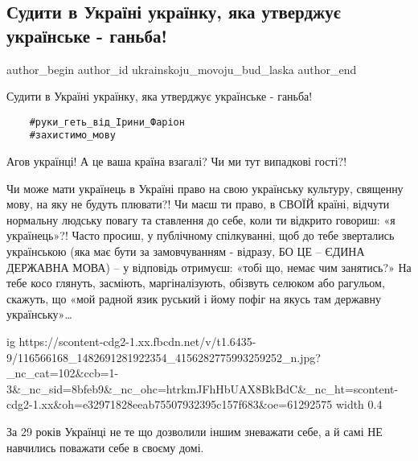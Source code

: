  
 
 
 
 
 
\subsection{Судити в Україні українку, яка утверджує українське - ганьба!}
\label{sec:29_07_2020.fb.ukrainskoju_movoju_bud_laska.1.farion_sud_ganba}
 
\ifcmt
 author_begin
   author_id ukrainskoju_movoju_bud_laska
 author_end
\fi

Судити в Україні українку, яка утверджує українське - ганьба!

\begin{verbatim}
	#руки_геть_від_Ірини_Фаріон
	#захистимо_мову
\end{verbatim}

Агов українці! А це ваша країна взагалі? Чи ми тут випадкові гості?! 

Чи може мати українець в Україні право на свою українську культуру, священну
мову, на яку не будуть плювати?! Чи маєш ти право, в СВОЇЙ країні, відчути
нормальну людську повагу та ставлення до себе, коли ти відкрито говориш: «я
українець»?! Часто просиш, у публічному спілкуванні, щоб до тебе звертались
українською (яка має бути за замовчуванням - відразу, БО ЦЕ – ЄДИНА ДЕРЖАВНА
МОВА) – у відповідь отримуєш: «тобі що, немає чим занятись?» На тебе косо
глянуть, засміють, маргіналізують, обізвуть селюком або рагульом, скажуть, що
«мой радной язик руський і йому пофіг на якусь там державну українську»…

\ifcmt
  ig https://scontent-cdg2-1.xx.fbcdn.net/v/t1.6435-9/116566168_1482691281922354_4156282775993259252_n.jpg?_nc_cat=102&ccb=1-3&_nc_sid=8bfeb9&_nc_ohc=htrkmJFhHbUAX8BkBdC&_nc_ht=scontent-cdg2-1.xx&oh=e32971828eeab75507932395c157f683&oe=61292575
  width 0.4
\fi

За 29 років Українці не те що дозволили іншим зневажати себе, а й самі НЕ
навчились поважати себе в своєму домі. 

